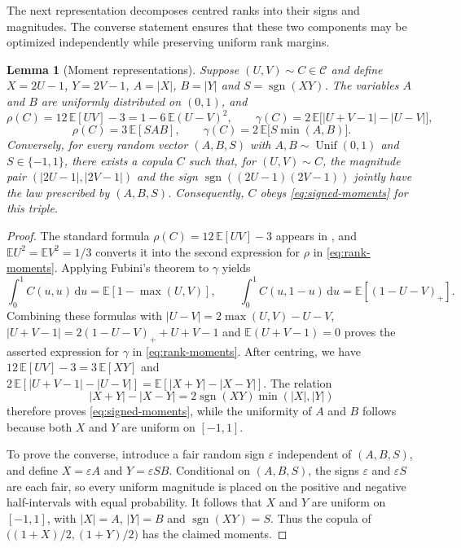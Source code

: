 \documentclass{article}
\newtheorem{lemma}[theorem]{Lemma}
\theoremstyle{definition}
\theoremstyle{remark}
\newcommand{\1}{\mathds{1}}
\newcommand{\de}{\,\mathrm{d}}
\newcommand{\E}{\mathbb{E}}
\newcommand{\CC}{\mathcal{C}}
\DeclareMathOperator{\sgn}{sgn}
\DeclareMathOperator{\Unif}{Unif}
\begin{document}
The next representation decomposes centred ranks into their signs and
magnitudes. The converse statement ensures that these two components may be
optimized independently while preserving uniform rank margins.

\begin{lemma}[Moment representations]\label{lem:representations}
	Suppose $(U,V)\sim C\in\CC$ and define $X=2U-1$, $Y=2V-1$, $A=|X|$, $B=|Y|$ and $S=\sgn(XY)$.
	The variables $A$ and $B$ are uniformly distributed on $(0,1)$, and
	\begin{equation}\label{eq:rank-moments}
		\rho(C)=12\,\E[UV]-3=1-6\,\E(U-V)^2,\qquad
		\gamma(C)=2\,\E\bigl[|U+V-1|-|U-V|\bigr],
	\end{equation}
	\begin{equation}\label{eq:signed-moments}
		\rho(C)=3\,\E[SAB],\qquad
		\gamma(C)=2\,\E\bigl[S\min(A,B)\bigr].
	\end{equation}
	Conversely, for every random vector $(A,B,S)$ with $A,B\sim\Unif(0,1)$ and $S\in\{-1,1\}$, there exists a copula $C$ such that, for $(U,V)\sim C$, the magnitude pair $(|2U-1|,|2V-1|)$ and the sign $\sgn((2U-1)(2V-1))$ jointly have the law prescribed by $(A,B,S)$. Consequently, $C$ obeys \eqref{eq:signed-moments} for this triple.
\end{lemma}

\begin{proof}
	The standard formula $\rho(C)=12\,\E[UV]-3$ appears in \citet[Sec.~5.1]{nelsen2006introduction}, and $\E U^2=\E V^2=1/3$ converts it into the second expression for $\rho$ in \eqref{eq:rank-moments}.
	Applying Fubini's theorem to $\gamma$ yields
	\[
		\int_0^1C(u,u)\de u=\E[1-\max(U,V)],\qquad\int_0^1C(u,1-u)\de u=\E[(1-U-V)_+].
	\]
	Combining these formulas with $|U-V|=2\max(U,V)-U-V$, $|U+V-1|=2(1-U-V)_++U+V-1$ and $\E(U+V-1)=0$ proves the asserted expression for $\gamma$ in \eqref{eq:rank-moments}.
	After centring, we have $12\,\E[UV]-3=3\,\E[XY]$ and $2\,\E[|U+V-1|-|U-V|]=\E[|X+Y|-|X-Y|]$. The relation
	\[
		|X+Y|-|X-Y|=2\sgn(XY)\min(|X|,|Y|)
	\]
	therefore proves \eqref{eq:signed-moments}, while the uniformity of $A$ and $B$ follows because both $X$ and $Y$ are uniform on $[-1,1]$.

	To prove the converse, introduce a fair random sign $\varepsilon$ independent of $(A,B,S)$, and define $X=\varepsilon A$ and $Y=\varepsilon SB$.
	Conditional on $(A,B,S)$, the signs $\varepsilon$ and $\varepsilon S$ are each fair, so every uniform magnitude is placed on the positive and negative half-intervals with equal probability.
	It follows that $X$ and $Y$ are uniform on $[-1,1]$, with $|X|=A$, $|Y|=B$ and $\sgn(XY)=S$. Thus the copula of $\bigl((1+X)/2,(1+Y)/2\bigr)$ has the claimed moments.
\end{proof}
\end{document}
